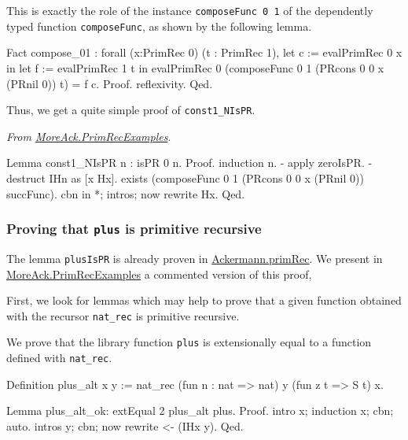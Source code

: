 This is exactly the role of the instance \texttt{composeFunc 0 1} of the dependently typed
function \texttt{composeFunc}, as shown by the following lemma.

\begin{Coqsrc}
Fact compose_01 :
    forall (x:PrimRec 0) (t : PrimRec 1),
    let c := evalPrimRec 0 x in
    let f := evalPrimRec 1 t in
    evalPrimRec 0 (composeFunc 0 1
                               (PRcons 0 0 x (PRnil 0))
                               t)  =
     f c.
Proof. reflexivity. Qed.
\end{Coqsrc}

Thus, we get a quite simple proof of \texttt{const1\_NIsPR}.


\vspace{4pt}
\noindent
\emph{From \href{../theories/html/hydras.MoreAck.PrimRecExamples.html}{MoreAck.PrimRecExamples}}.
\begin{Coqsrc}
Lemma  const1_NIsPR n : isPR 0 n. 
Proof.
  induction n.
  - apply zeroIsPR.
  - destruct IHn as [x Hx].
   exists (composeFunc 0 1 (PRcons 0 0 x (PRnil 0)) succFunc). 
   cbn in *; intros; now rewrite Hx.
Qed.
\end{Coqsrc}


\subsubsection{Proving that \texttt{plus} is primitive recursive}

The lemma \texttt{plusIsPR} is already proven in \href{../theories/html/hydras.Ackermann.primRec.html}{Ackermann.primRec}. We present in 
\href{../theories/html/hydras.MoreAck.PrimRecExamples.html}{MoreAck.PrimRecExamples}
a commented version of this proof, 

First, we look for lemmas which may help to prove that a given function obtained with the recursor \texttt{nat\_rec} is primitive recursive.




We prove that the library function \texttt{plus} is extensionally equal to a function defined with
\texttt{nat\_rec}.

\begin{Coqsrc}
Definition plus_alt x y  :=
              nat_rec  (fun n : nat => nat)
                       y
                       (fun z t =>  S t)
                       x.

Lemma plus_alt_ok:
  extEqual 2 plus_alt plus.
Proof.
  intro x; induction x; cbn; auto.
  intros y; cbn; now rewrite <- (IHx y).
Qed.
\end{Coqsrc}

